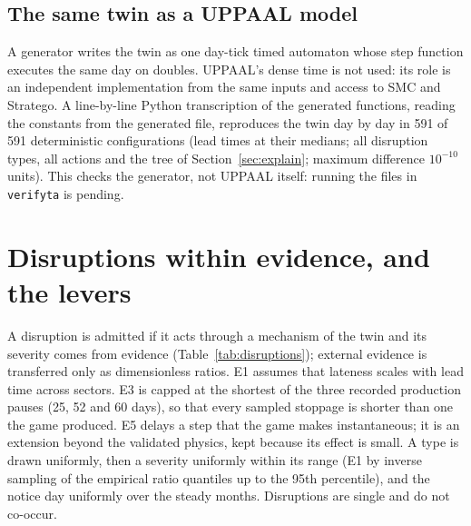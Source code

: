 \documentclass{ifacconf}
\begin{document}
\subsection{The same twin as a UPPAAL model}
A generator writes the twin as one day-tick timed automaton whose step function executes the same day on
doubles. UPPAAL's dense time is not used: its role is an independent implementation from the same inputs and
access to SMC and Stratego. A line-by-line Python transcription of the generated functions, reading the
constants from the generated file, reproduces the twin day by day in 591 of 591 deterministic configurations
(lead times at their medians; all disruption types, all actions and the tree of Section~\ref{sec:explain};
maximum difference $10^{-10}$ units). This checks the generator, not UPPAAL itself: running the files in
\texttt{verifyta} is pending.

\section{Disruptions within evidence, and the levers}

A disruption is admitted if it acts through a mechanism of the twin and its severity comes from evidence
(Table~\ref{tab:disruptions}); external evidence is transferred only as dimensionless ratios. E1 assumes that lateness scales with lead time across
sectors. E3 is capped at the shortest of the three recorded production
pauses (25, 52 and 60 days), so that every sampled stoppage is shorter than one the game produced. E5 delays a
step that the game makes instantaneous; it is an extension beyond the validated physics, kept because its effect
is small. A type is drawn uniformly, then a severity uniformly within its range (E1 by inverse sampling of the
empirical ratio quantiles up to the 95th percentile), and the notice day uniformly over the steady months. Disruptions are single and
do not co-occur.
\end{document}
